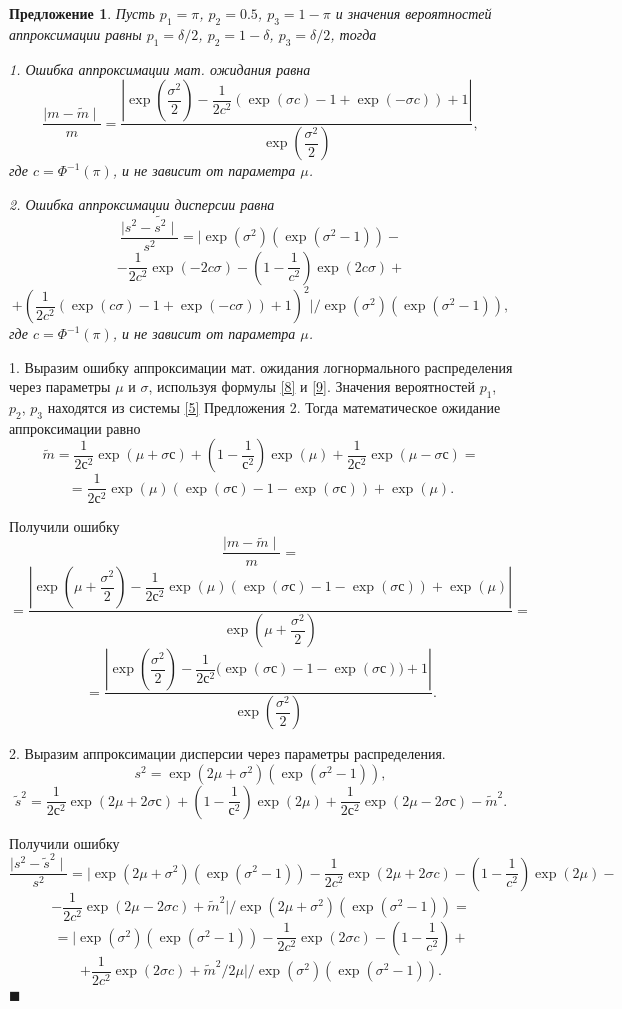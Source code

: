 \documentclass[12pt]{article}
\newtheorem{proposition}[theorem]{Предложение}
\newenvironment{Proof}{\par\noindent{\bf Доказательство.}}{\hfill$\scriptstyle\blacksquare$}
\begin{document}
	\begin{proposition}\label{pr7}
		Пусть $p_{1} = \pi$, $p_{2} = 0.5$, $p_{3} = 1-\pi$ и значения вероятностей аппроксимации равны $p_{1} = \delta/2$, $p_{2} = 1-\delta$, $p_{3} = \delta/2$, тогда
		
		1. Ошибка аппроксимации мат. ожидания равна
		\[\dfrac{\mid m - \widetilde{m} \mid}{m}  = \dfrac{\left|\exp\left(\dfrac{\sigma^{2}}{2}\right) - \dfrac{1}{2c^{2}}\left(\exp(\sigma c)-1 +\exp(-\sigma c)\right) + 1\right|}{\exp\left(\dfrac{\sigma^{2}}{2}\right)},\]
		где $c = \Phi^{-1}(\pi)$, и не зависит от параметра $\mu$.
		
		2. Ошибка аппроксимации дисперсии равна
		\[\dfrac{\mid s^{2} - \widetilde{s^{2}} \mid}{s^{2}} = \biggl|\exp(\sigma^{2})(\exp(\sigma^{2}-1)) -\]\[- \dfrac{1}{2c^{2}}\exp(-2c\sigma)- \left( 1- \dfrac{1}{c^{2}}\right) \exp(2c\sigma)+\]\[+ \left( \dfrac{1}{2c^{2}}(\exp(c\sigma)-1+\exp(-c\sigma)) + 1\right) ^{2}\biggr| /\exp(\sigma^{2})(\exp(\sigma^{2}-1)),\]
		где $c = \Phi^{-1}(\pi)$, и не зависит от параметра $\mu$.
		
	\end{proposition}
	\begin{Proof}
		1. Выразим ошибку аппроксимации мат. ожидания логнормального распределения через параметры $\mu$ и $\sigma$, используя формулы \eqref{8} и \eqref{9}. Значения вероятностей $p_{1}$, $p_{2}$, $p_{3}$ находятся из системы \eqref{5} Предложения 2. Тогда математическое ожидание аппроксимации равно
		\[\tilde{m} = \dfrac{1}{2с^{2}}\exp(\mu+\sigma с)+\left(1 - \dfrac{1}{с^{2}}\right)\exp(\mu)+ \dfrac{1}{2с^{2}}\exp(\mu-\sigma с)=\]
		\[= \dfrac{1}{2с^{2}} \exp(\mu)(\exp(\sigma с)-1-\exp(\sigma с)) + \exp(\mu). \]
		
		Получили ошибку
		\[\dfrac{\mid m - \widetilde{m} \mid}{m} = \]\[=\dfrac{\left| \exp\left(\mu+\dfrac{\sigma^{2}}{2}\right) - \dfrac{1}{2с^{2}} \exp(\mu)(\exp(\sigma с)-1 -\exp(\sigma с)) + \exp(\mu) \right|}{\exp\left(\mu+\dfrac{\sigma^{2}}{2}\right)}=\]
		\[=\dfrac{\left| \exp\left(\dfrac{\sigma^{2}}{2}\right) - \dfrac{1}{2с^{2}} \bigg(\exp(\sigma с)-1 -\exp(\sigma с)\bigg) + 1 \right|}{\exp\left(\dfrac{\sigma^{2}}{2}\right)}.\]
		
		2. Выразим аппроксимации дисперсии через параметры распределения.
		\[s^{2} = \exp(2\mu+\sigma^{2})(\exp(\sigma^{2}-1)),\]
		\[\tilde{s}^{2} = \dfrac{1}{2с^{2}}\exp(2\mu+2\sigma с)+\left(1 - \dfrac{1}{с^{2}}\right)\exp(2\mu)+ \dfrac{1}{2с^{2}}\exp(2\mu-2\sigma с) - \tilde{m}^{2}.\]
		
		Получили ошибку
		\[\dfrac{\mid s^{2} - \widetilde{s}^{2} \mid}{s^{2}} = \biggl| \exp(2\mu+\sigma^{2})(\exp(\sigma^{2}-1)) - \dfrac{1}{2c^{2}}\exp(2\mu+2\sigma c)- \left(1 - \dfrac{1}{c^{2}}\right)\exp(2\mu)-\]
		\[-\dfrac{1}{2c^{2}}\exp(2\mu-2\sigma c) + \tilde{ m}^{2}\biggr|/\exp(2\mu+\sigma^{2})(\exp(\sigma^{2}-1))=\]
		\[=\biggl| \exp(\sigma^{2})(\exp(\sigma^{2}-1)) - \dfrac{1}{2c^{2}}\exp(2\sigma c)- \left(1 - \dfrac{1}{c^{2}}\right)+\]
		\[+\dfrac{1}{2c^{2}}\exp(2\sigma c) + \tilde{ m}^{2}/2\mu\biggr|/\exp(\sigma^{2})(\exp(\sigma^{2}-1)).\]
	\end{Proof}
\end{document}

